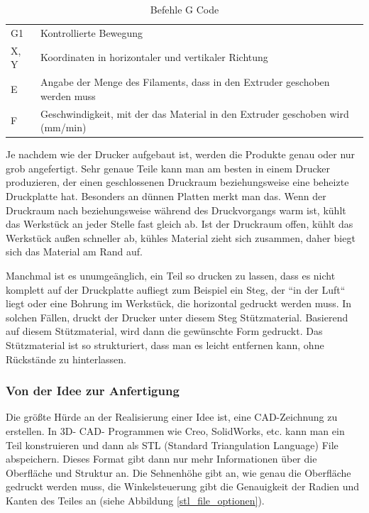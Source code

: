 			\begin{table}[htbp]
  		\centering
  		\caption{Befehle G Code}
	    \begin{tabular}{ll}
	    G1    & Kontrollierte Bewegung \\
	    X, Y  & Koordinaten in horizontaler und vertikaler Richtung \\
	    E     & Angabe der Menge des Filaments, dass in den Extruder geschoben werden muss \\
	    F     & Geschwindigkeit, mit der das Material in den Extruder geschoben wird (mm/min) \\
	    \end{tabular}%
	  	\label{tab:befehle gcode}%
			\end{table}%

		Je nachdem wie der Drucker aufgebaut ist, werden die Produkte genau oder nur grob angefertigt.
		Sehr genaue Teile kann man am besten in einem Drucker produzieren, der einen geschlossenen Druckraum beziehungsweise eine beheizte Druckplatte hat.
		Besonders an dünnen Platten merkt man das.
		Wenn der Druckraum nach beziehungsweise während des Druckvorgangs warm ist, kühlt das Werkstück an jeder Stelle fast gleich ab.
		Ist der Druckraum offen, kühlt das Werkstück außen schneller ab, kühles Material zieht sich zusammen, daher biegt sich das Material am Rand auf.

		Manchmal ist es unumgeänglich, ein Teil so drucken zu lassen, dass es nicht komplett auf der Druckplatte aufliegt zum Beispiel ein Steg,
		der “in der Luft“ liegt oder eine Bohrung im Werkstück, die horizontal gedruckt werden muss.
		In solchen Fällen, druckt der Drucker unter diesem Steg Stützmaterial. Basierend auf diesem Stützmaterial, wird dann die gewünschte Form gedruckt.
		Das Stützmaterial ist so strukturiert, dass man es leicht entfernen kann, ohne Rückstände zu hinterlassen.

		\subsubsection{Von der Idee zur Anfertigung}

		Die größte Hürde an der Realisierung einer Idee ist, eine CAD-Zeichnung zu erstellen. In 3D- CAD- Programmen wie Creo, SolidWorks, etc. kann man ein Teil konstruieren und dann als STL (Standard Triangulation Language) File abspeichern.
		Dieses Format gibt dann nur mehr Informationen über die Oberfläche und Struktur an.
		Die Sehnenhöhe gibt an, wie genau die Oberfläche gedruckt werden muss, die Winkelsteuerung gibt die Genauigkeit der Radien und Kanten des Teiles an (siehe Abbildung \ref{stl_file_optionen}).


